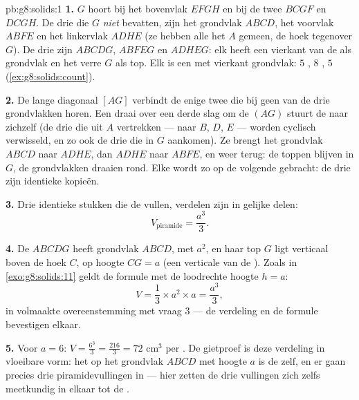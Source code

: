 \begin{solution}{pb:g8:solids:1}
\textbf{1.} $G$ hoort bij het bovenvlak $EFGH$ en bij de twee  $BCGF$
en $DCGH$. De drie  die $G$ \emph{niet} bevatten, zijn het grondvlak
$ABCD$, het voorvlak $ABFE$ en het linkervlak $ADHE$ (ze hebben alle het
 $A$ gemeen, de hoek tegenover $G$). De drie  zijn $ABCDG$,
$ABFEG$ en $ADHEG$: elk heeft een vierkant  van de  als grondvlak en
het verre  $G$ als top. Elk is een  met vierkant grondvlak: $5$
, $8$ , $5$  (\cref{ex:g8:solids:count}).

\textbf{2.} De lange diagonaal $[AG]$ verbindt de enige twee  die bij
geen van de drie grondvlakken horen. Een draai over een derde slag om de 
$(AG)$ stuurt de  naar zichzelf (de drie  die uit $A$ vertrekken ---
naar $B$, $D$, $E$ --- worden cyclisch verwisseld, en zo ook de drie  die in
$G$ aankomen). Ze brengt het grondvlak $ABCD$ naar $ADHE$, dan $ADHE$ naar
$ABFE$, en weer terug: de toppen blijven in $G$, de grondvlakken draaien rond.
Elke  wordt zo op de volgende gebracht: de drie zijn identieke kopieën.

\textbf{3.} Drie identieke stukken die de  vullen, verdelen zijn  in
gelijke delen:
\[
V_{\text{piramide}} = \frac{a^3}{3} .
\]

\textbf{4.} De  $ABCDG$ heeft grondvlak $ABCD$, met  $a^2$, en
haar top $G$ ligt verticaal boven de hoek $C$, op hoogte $CG = a$ (een verticale
 van de ). Zoals in \cref{exo:g8:solids:11} geldt de formule met de
loodrechte hoogte $h = a$:
\[
V = \frac13 \times a^2 \times a = \frac{a^3}{3} ,
\]
in volmaakte overeenstemming met vraag 3 --- de verdeling en de formule
bevestigen elkaar.

\textbf{5.} Voor $a = 6$: $V = \frac{6^3}{3} = \frac{216}{3} = 72$ cm$^3$ per
. De gietproef is deze verdeling in vloeibare vorm: het  op het
grondvlak $ABCD$ met hoogte $a$ is de  zelf, en er gaan precies drie
piramidevullingen in --- hier zetten de drie vullingen zich zelfs meetkundig in
elkaar tot de .


\end{solution}
